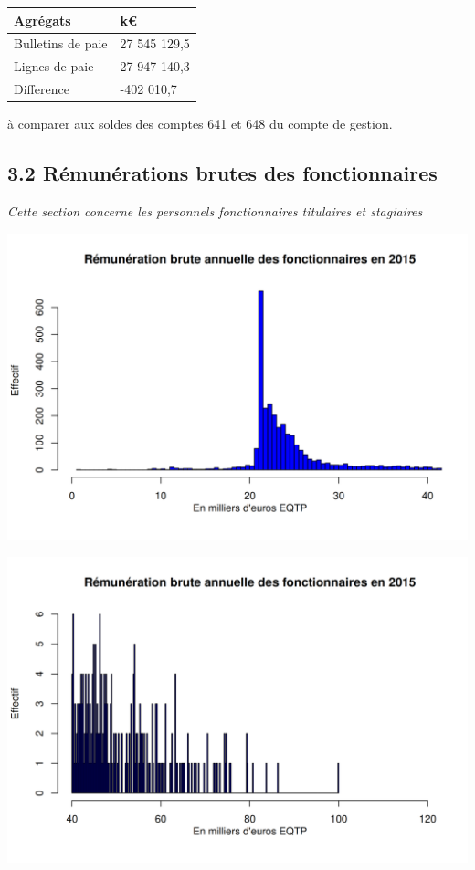 \begin{longtable}[]{@{}ll@{}}
\toprule
Agrégats & k€\tabularnewline
\midrule
\endhead
Bulletins de paie & 27 545 129,5\tabularnewline
Lignes de paie & 27 947 140,3\tabularnewline
Difference & -402 010,7\tabularnewline
\bottomrule
\end{longtable}

à comparer aux soldes des comptes 641 et 648 du compte de gestion.

\hypertarget{remunerations-brutes-des-fonctionnaires-1}{%
\subsection{3.2 Rémunérations brutes des
fonctionnaires}\label{remunerations-brutes-des-fonctionnaires-1}}

\emph{Cette section concerne les personnels fonctionnaires titulaires et
stagiaires}

\includegraphics{altair_files/figure-latex/unnamed-chunk-76-1.png}

\includegraphics{altair_files/figure-latex/unnamed-chunk-76-2.png}

